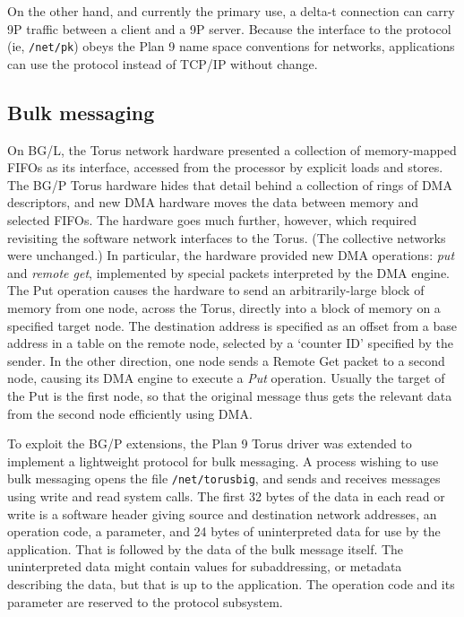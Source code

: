 On the other hand, and currently the primary use, a delta-t connection can carry 9P traffic between a client and a 9P server. Because the interface to the protocol (ie, \texttt{/net/pk}) obeys the Plan 9 name space conventions for networks, applications can use the protocol instead of TCP/IP without change.

\subsection{Bulk messaging}

On BG/L, the Torus network hardware presented a collection of memory-mapped FIFOs as its interface, accessed from the processor by explicit loads and stores.
The BG/P Torus hardware hides that detail behind a collection of rings of DMA descriptors, and new DMA hardware moves the data between memory and selected FIFOs.
The hardware goes much further, however, which required revisiting the software network interfaces to the Torus.
(The collective networks were unchanged.)
In particular, the hardware provided new DMA operations: \emph{put} and \emph{remote get}, implemented by special packets interpreted by the DMA engine.
The Put operation causes the hardware to send an arbitrarily-large block of memory from one node, across the Torus, directly into a block of memory on a specified target node.
The destination address is specified as an offset from a base address in a table on the remote node, selected by a `counter ID' specified by the sender.
In the other direction, one node sends a Remote Get packet to a second node, causing
its DMA engine to execute a \emph{Put} operation.
Usually the target of the Put is the first node, so that the original message thus gets the relevant data from the second node efficiently using DMA.

To exploit the BG/P extensions, the Plan 9 Torus driver was extended to implement a lightweight protocol for bulk messaging. A process wishing to use bulk messaging opens the file \texttt{/net/torusbig}, and sends and receives messages using write and read system calls. The first 32 bytes of the data in each read or write is a software header giving source and destination network addresses, an operation code, a parameter, and 24 bytes of uninterpreted data for use by the application.
That is followed by the data of the bulk message itself.
The uninterpreted data might contain values for subaddressing, or metadata describing the data, but that is up to the application. The operation code and its parameter are reserved to the protocol subsystem.

